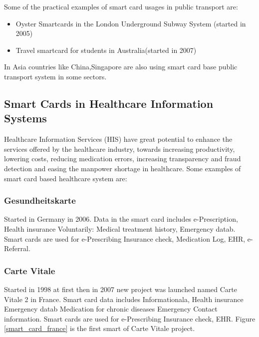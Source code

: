 \documentclass[12pt]{article}
\begin{document}
Some of the practical examples of smart card usages in public transport are:
\begin{itemize}
\item Oyster Smartcards in the London Underground Subway System (started in 2005)
\item Travel smartcard for students in Australia(started in 2007)

\end{itemize}
In Asia countries like China,Singapore are also using smart card base public transport system in some sectors.

\subsection{Smart Cards in Healthcare Information Systems}
Healthcare Information Services (HIS) have great
potential to enhance the services offered by the
healthcare industry, towards increasing productivity,
lowering costs, reducing medication errors, increasing
transparency and fraud detection and easing the manpower
shortage in healthcare.
Some examples of smart card based healthcare system are:
\subsubsection{Gesundheitskarte}
Started in Germany in 2006. Data in the smart card includes e-Prescription,
Health insurance
Voluntarily:
Medical treatment
history, Emergency
datab. Smart cards are used for e-Prescribing
Insurance
check,
Medication
Log, EHR,
e-Referral.

\subsubsection{Carte Vitale}
Started in 1998 at first then in 2007 new project was launched named Carte Vitale 2 in France. Smart card data includes Informationala,
Health insurance
Emergency datab
Medication for
chronic diseases
Emergency Contact
information. Smart cards are used for e-Prescribing
Insurance
check,
EHR. Figure \ref{smart_card_france} is the first smart of Carte Vitale project.
\end{document}
